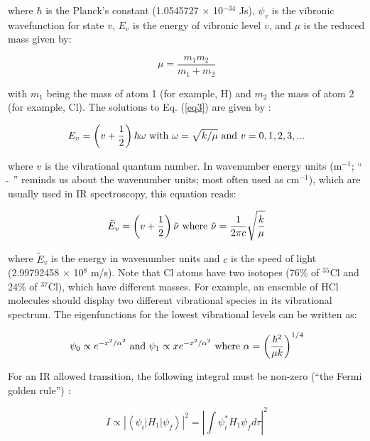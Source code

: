 \documentclass[byrevtex,amssymb,aps,pra,floatfix,letterpaper]{revtex4}
\begin{document}
\noindent
where $\hbar$ is the Planck's constant (1.0545727 $\times$ 10$^{-34}$ Js), $\psi_v$ is the vibronic wavefunction for state $v$, $E_v$ is the energy of vibronic level $v$, and $\mu$ is the reduced mass given by:

\begin{equation}
\mu = \frac{m_1 m_2}{m_1 + m_2}
\label{eq4}
\end{equation}

\noindent
with $m_1$ being the mass of atom 1 (for example, H) and $m_2$ the mass of atom 2 (for example, Cl). The solutions to Eq. (\ref{eq3}) are given by \cite{ATKINS1,HERZBERG1}:

\begin{equation}
E_v = \left(v + \frac{1}{2}\right)\hbar\omega\textnormal{ with }\omega = \sqrt{k/\mu}\textnormal{ and }v = 0,1,2,3,...
\label{eq5}
\end{equation}

\noindent
where $v$ is the vibrational quantum number. In wavenumber energy units (m$^{-1}$; `` $\tilde{~}$ '' reminds us about the wavenumber units; most often used as cm$^{-1}$), which are usually used in IR spectroscopy, this equation reads:

\begin{equation}
\tilde{E}_v = \left(v + \frac{1}{2}\right)\tilde{\nu}\textnormal{ where }\tilde{\nu} = \frac{1}{2\pi c}\sqrt{\frac{k}{\mu}}
\label{eq6}
\end{equation}

\noindent
where $\tilde{E}_v$ is the energy in wavenumber units and $c$ is the speed of light (2.99792458 $\times$ 10$^8$ m/s). Note that Cl atoms have two isotopes (76\% of $^{35}$Cl and 24\% of $^{37}$Cl), which have different masses. For example, an ensemble of HCl molecules should display two different vibrational species in its vibrational spectrum. The eigenfunctions for the lowest vibrational levels can be written as:

\begin{equation}
\psi_0 \propto e^{-x^2/\alpha^2}\textnormal{ and }\psi_1 \propto xe^{-x^2/\alpha^2}\textnormal{ where }\alpha = \left(\frac{\hbar^2}{\mu k}\right)^{1/4}
\label{eq7}
\end{equation}

\noindent
For an IR allowed transition, the following integral must be non-zero (``the Fermi golden rule'') \cite{ATKINS2}:

\begin{equation}
I \propto \left|\left<\psi_i\left|H_1\right|\psi_f\right>\right|^2 = \left|\int\psi_i^*H_1\psi_fd\tau\right|^2
\label{eq8}
\end{equation}
\end{document}
